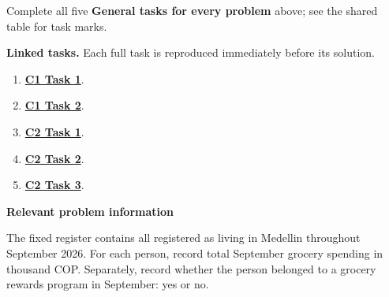 
Complete all five \textbf{General tasks for every problem} above; see the shared table for task marks.

\clearpage
\textbf{Linked tasks.} Each full task is reproduced immediately before its solution.

\begin{enumerate}[label=(\alph*),itemsep=6pt]
\item \hyperref[sol:p1c1a]{\textbf{C1 Task 1}}. \cOneA\ 
\item \hyperref[sol:p1c1b]{\textbf{C1 Task 2}}. \cOneB\ 
\item \hyperref[sol:p1c2a]{\textbf{C2 Task 1}}. \cTwoA\ 
\item \hyperref[sol:p1c2b]{\textbf{C2 Task 2}}. \cTwoB\ 
\item \hyperref[sol:p1c2c]{\textbf{C2 Task 3}}. \cTwoC\ 
\end{enumerate}
\secInicio[][sec:p1]

\clearpage



\textbf{Relevant problem information}

\begin{probleminfoexcerpt}
The fixed register contains all    registered as living in Medellin throughout September 2026. For each person, record total September grocery spending in thousand COP. Separately, record whether the person belonged to a grocery rewards program in September: yes or no.
\end{probleminfoexcerpt}

